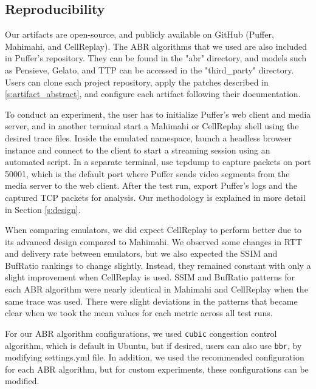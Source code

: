 \subsection{Reproducibility}

%
Our artifacts are open-source, and publicly available on GitHub (Puffer, Mahimahi, and CellReplay). The ABR algorithms that we used are also included in Puffer's repository. They can be found in the "abr" directory, and models such as Pensieve, Gelato, and TTP can be accessed in the "third\_party" directory. Users can clone each project repository, apply the patches described in \ref{s:artifact_abstract}, and configure each artifact following their documentation.

%
To conduct an experiment, the user has to initialize Puffer's web client and media server, and in another terminal start a Mahimahi or CellReplay shell using the desired trace files. Inside the emulated namespace, launch a headless browser instance and connect to the client to start a streaming session using an automated script. In a separate terminal, use tcpdump to capture packets on port 50001, which is the default port where Puffer sends video segments from the media server to the web client. After the test run, export Puffer's logs and the captured TCP packets for analysis. Our methodology is explained in more detail in Section \ref{s:design}.

%
When comparing emulators, we did expect CellReplay to perform better due to its advanced design compared to Mahimahi. We observed some changes in RTT and delivery rate between emulators, but we also expected the SSIM and BufRatio rankings to change slightly. Instead, they remained constant with only a slight improvement when CellReplay is used. SSIM and BufRatio patterns for each ABR algorithm were nearly identical in Mahimahi and CellReplay when the same trace was used. There were slight deviations in the patterns that became clear when we took the mean values for each metric across all test runs.

%
For our ABR algorithm configurations, we used \texttt{cubic} congestion control algorithm, which is default in Ubuntu, but if desired, users can also use \texttt{bbr}, by modifying settings.yml file. In addition, we used the recommended configuration for each ABR algorithm, but for custom experiments, these configurations can be modified.


